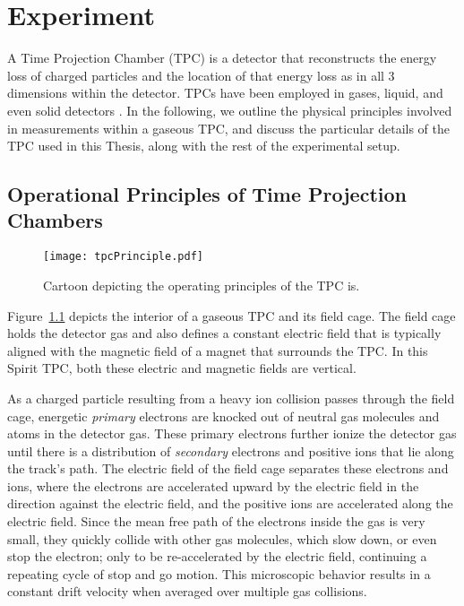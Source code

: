 \chapter{Experiment}
\label{chap:experiment}

A Time Projection Chamber (TPC) is a detector that reconstructs the energy loss of charged particles and the location of that energy loss as in all 3 dimensions within the detector. TPCs have been employed in gases, liquid, and even solid detectors \cite{starTPC,arTPC,eosTPC}. In the following, we outline the physical principles involved in measurements within a gaseous TPC, and discuss the particular details of the TPC used in this Thesis, along with the rest of the experimental setup.


\section{Operational Principles of Time Projection Chambers}

\begin{figure}[!htb]
\centering
\texttt{[image: tpcPrinciple.pdf]}
\caption{Cartoon depicting the operating principles of the TPC is.}
\label{fig:tpcPrinciple}
\end{figure}

Figure~\ref{fig:tpcPrinciple} depicts the interior of a gaseous TPC and its field cage. The field cage holds the detector gas and also defines a constant electric field that is typically aligned with the magnetic field of a magnet that surrounds the TPC. In this Spirit TPC, both these electric and magnetic fields are vertical.  

As a charged particle resulting from a heavy ion collision passes through the field cage, energetic \emph{primary} electrons are knocked out of neutral gas molecules and atoms in the detector gas. These primary electrons further ionize the detector gas until there is a distribution of \emph{secondary} electrons and positive ions that lie along the track's path. The electric field of the field cage separates these electrons and ions, where the electrons are accelerated upward by the electric field in the direction against the electric field, and the positive ions are accelerated along the electric field. Since the mean free path of the electrons inside the gas is very small, they quickly collide with other gas molecules, which slow down, or even stop the electron; only to be re-accelerated by the electric field, continuing a repeating cycle of stop and go motion. This microscopic behavior results in a constant drift velocity when averaged over multiple gas collisions. 

